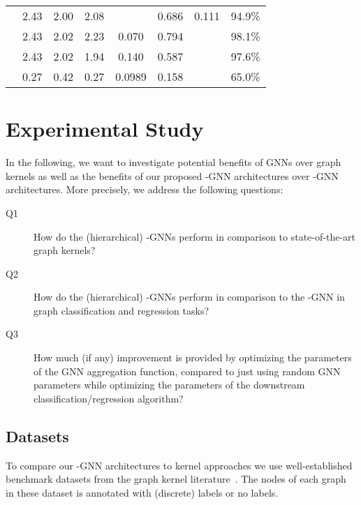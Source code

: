 \documentclass[letterpaper]{article}
\theoremstyle{definition}
\begin{document}
\begin{table*}[t]
\begin{tabular}{lccccccc}
		                         & 2.43                                   & 2.00                                   & 2.08               &        & 0.686                & 0.111                      & 94.9\% \\
		                         & 2.43                                   & 2.02                                   & 2.23               & 0.070                  & 0.794                &           & 98.1\% \\
		                         & 2.43                                   & 2.02                                   & 1.94               & 0.140                  & 0.587                &           & 97.6\% \\
		              & 0.27                                   & 0.42                                   & 0.27               & 0.0989                 & 0.158                &           & 65.0\% \\
		\bottomrule
	\end{tabular}
\end{table*}


\section{Experimental Study}

In the following, we want to investigate potential benefits of GNNs over graph kernels as well as the benefits of our proposed -GNN architectures over -GNN architectures. More precisely, we address the following questions:
\begin{description}
	\item[Q1] How do the (hierarchical) -GNNs perform in comparison to state-of-the-art graph kernels? 
	\item[Q2] How do the (hierarchical)  -GNNs perform in comparison to the -GNN in graph classification and regression tasks?
	\item[Q3]
	How much (if any) improvement is provided by optimizing the parameters of the GNN aggregation function, compared to just using random GNN parameters while optimizing the parameters of the downstream classification/regression algorithm?
\end{description}

\subsection{Datasets }
To compare our -GNN architectures to kernel approaches we use well-established benchmark datasets from the graph kernel literature~\cite{KKMMN2016}. The nodes of each graph in these dataset is annotated with (discrete) labels or no labels. 
\end{document}
